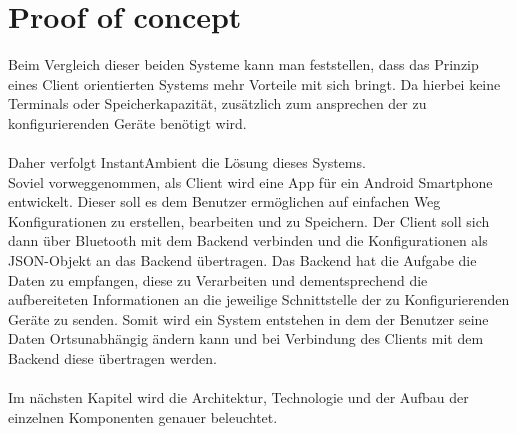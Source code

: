 \section{Proof of concept}

Beim Vergleich dieser beiden Systeme kann man feststellen, dass das Prinzip eines Client orientierten Systems mehr Vorteile mit sich bringt. Da hierbei keine Terminals oder Speicherkapazität, zusätzlich zum ansprechen der zu konfigurierenden Geräte benötigt wird. 
\\\\ 
Daher verfolgt InstantAmbient die Lösung dieses Systems. \\
Soviel vorweggenommen, als Client wird eine App für ein Android Smartphone entwickelt. Dieser soll es dem Benutzer ermöglichen auf einfachen Weg Konfigurationen zu erstellen, bearbeiten und zu Speichern. Der Client soll sich dann über Bluetooth mit dem Backend verbinden und die Konfigurationen als JSON-Objekt an das Backend übertragen. Das Backend hat die Aufgabe die Daten zu empfangen, diese zu Verarbeiten und dementsprechend die aufbereiteten Informationen an die jeweilige Schnittstelle der zu Konfigurierenden Geräte zu senden. 
Somit wird ein System entstehen in dem der Benutzer seine Daten Ortsunabhängig ändern kann und bei Verbindung des Clients mit dem Backend diese übertragen werden. 
\\\\
Im nächsten Kapitel wird die Architektur, Technologie und der Aufbau der einzelnen Komponenten genauer beleuchtet.